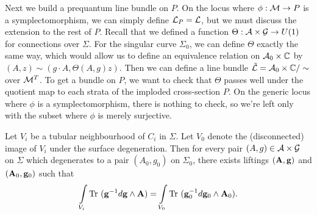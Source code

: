 	Next we build a prequantum line bundle on $P$. On the locus where $\phi:\mathcal{M}\to P$ is a symplectomorphism, we can simply define $\mathcal{L}_P = \mathcal{L}$, but we must discuss the extension to the rest of $P$. Recall that we defined a function $\Theta:\mathcal{A}\times\mathcal{G}\to U(1)$ for connections over $\Sigma$. For the singular curve $\Sigma_0$, we can define $\Theta$ exactly the same way, which would allow us to define an equivalence relation on $\mathcal{A}_0\times \mathbb{C}$ by $(A,z)\sim (g\cdot A, \Theta(A,g)z)$. Then we can define a line bundle $\tilde{\mathcal{L}} = \mathcal{A}_0 \times \mathbb{C}/\sim$ over $\mathcal{M}^T$. To get a bundle on $P$, we want to check that $\Theta$ passes well under the quotient map to each strata of the imploded cross-section $P$. On the generic locus where $\phi$ is a symplectomorphism, there is nothing to check, so we're left only with the subset where $\phi$ is merely surjective. 
	\begin{lemma}
		Let $V_i$ be a tubular neighbourhood of $C_i$ in $\Sigma$. Let $V_{0}$ denote the (disconnected) image of $V_i$ under the surface degeneration. Then for every pair $(A,g)\in\mathcal{A}\times \mathcal{G}$ on $\Sigma$ which degenerates to a pair $(A_0, g_0)$ on $\Sigma_0$, there exists liftings $(\mathbf{A},\mathbf{g})$ and $(\mathbf{A}_0,\mathbf{g}_0)$ such that
		\begin{equation}
			\int\limits_{V_i} \text{Tr }(\mathbf{g}^{-1}d\mathbf{g}\wedge \mathbf{A}) = \int\limits_{V_0} \text{Tr }(\mathbf{g}_0^{-1}d\mathbf{g}_0\wedge \mathbf{A}_0).
		\end{equation}
		\label{l:main-lemma}
	\end{lemma}
